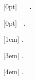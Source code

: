 \pagestyle{fancy}																%



%
  [0pt]%
  {\vspace{1cm} \hfill\bfseries\scshape\partname~}%
  {\large\bfseries\scshape\partname~\thecontentslabel.~}%
  {\large\bfseries\scshape}%
  {\hfill\bfseries\contentspage}%

%
  [0pt]%
  {}%
  {\large\bfseries\scshape\chaptername~\thecontentslabel.}%
  {\large\bfseries\scshape}%
  {\hfill\bfseries\contentspage}%

%
  [1em]%
  {}%
  {\thecontentslabel{}.~}%
  {}%
  {\hfill\contentspage}%

%
  [3em]%
  {\itshape}%
  {\itshape\thecontentslabel.~}%
  {}%
  {\dotfill\normalfont\contentspage }%

%
  [4em]%
  {}%
  {\thecontentslabel.~}%
  {}%
  {\dotfill\contentspage }%



\usepackage{remreset}

\def\acknowledgementsname{Acknowledments}
\def\summaryname{Summary}
\def\summarykeywordsname{Keywords}
\def\summaryabstractname{Abstract}
\def\sourcecodename{Code}
\def\figurename{Figure}
\def\tablename{Table}

\def\listofsourcecodename{List of \sourcecodename}
\def\listofreferencesname{}

